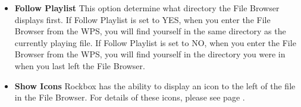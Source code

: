 \begin{itemize}
  \item \textbf{Follow Playlist}
    This option determine what directory the File Browser displays first.  If Follow Playlist is set to YES, when you enter the File Browser from the WPS, you will find yourself in the same directory as the currently playing file.  If Follow Playlist is set to NO, when you enter the File Browser from the WPS, you will find yourself in the directory you were in when you last left the File Browser.  
    
  \item \textbf{Show Icons}
    Rockbox has the ability to display an icon to the left of the file in the File Browser.  For details of these icons, please see page \pageref{ref:Supportedfileformats}.
  \end{itemize}
   